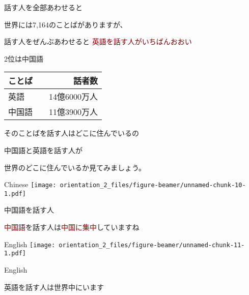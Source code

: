 \documentclass[
  ignorenonframetext,
  aspectratio=169,
  xcolor=dvipsnames]{beamer}
\begin{document}
\begin{frame}{話す人を全部あわせると}
\label{ux8a71ux3059ux4ebaux3092ux5168ux90e8ux3042ux308fux305bux308bux3068}
\Large

世界には7,164のことばがありますが、

話す人をぜんぶあわせると\pause
\textcolor{Maroon}{英語を話す人がいちばんおおい}\pause

2位は中国語\pause

\centering
\vfill

\begin{tabular}{lr}\toprule
ことば&話者数\\
\midrule
英語&14億6000万人\\
中国語　&11億3900万人\\
\bottomrule
\end{tabular}
\end{frame}

\begin{frame}{そのことばを話す人はどこに住んでいるの}
\label{ux305dux306eux3053ux3068ux3070ux3092ux8a71ux3059ux4ebaux306fux3069ux3053ux306bux4f4fux3093ux3067ux3044ux308bux306e}
\Large

中国語と英語を話す人が

世界のどこに住んでいるか見てみましょう。
\end{frame}

\begin{frame}{Chinese}
\label{chinese}
\texttt{[image: orientation\_2\_files/figure-beamer/unnamed-chunk-10-1.pdf]}
\end{frame}

\begin{frame}{中国語を話す人}
\label{ux4e2dux56fdux8a9eux3092ux8a71ux3059ux4eba}
\Large

\textcolor{Maroon}{中国語}を話す人は\textcolor{Maroon}{中国に集中}していますね
\end{frame}

\begin{frame}{English}
\label{english}
\texttt{[image: orientation\_2\_files/figure-beamer/unnamed-chunk-11-1.pdf]}
\end{frame}

\begin{frame}{English}
\label{english-1}
\Large

\textcolor{NavyBlue}{英語}を話す人は\textcolor{NavyBlue}{世界中にいます}
\end{frame}
\end{document}

